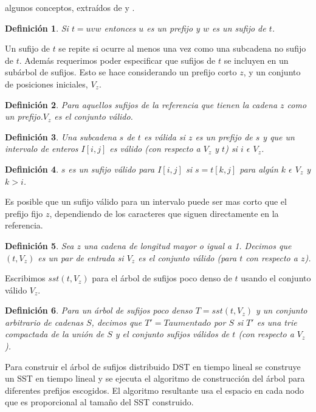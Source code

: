 \documentclass[12pt,a4paper]{article}
\newtheorem{mydef}{Definición}
\begin{document}
algunos conceptos, extraídos de \cite{Clifford2005} y \cite{Ghoting2010}. 
\begin{mydef}
  Si $t=uvw$ entonces $u$ es un \textit{prefijo} y $w$ es un \textit{sufijo}
de $t$.
\end{mydef}
Un sufijo de $t$ se repite si ocurre al menos una vez como una subcadena no sufijo de $t$.
Además requerimos poder especificar que sufijos de $t$ se incluyen en un subárbol de sufijos. Esto
se hace considerando un prefijo corto $z$, y un conjunto de posiciones iniciales, $V_{z}$.
\begin{mydef}
  Para aquellos sufijos de la referencia que tienen la cadena $z$ como un prefijo.$V_{z}$ es el conjunto válido.
\end{mydef}
\begin{mydef}
Una subcadena $s$ de $t$ es válida si $z$ es un prefijo de $s$ y que un intervalo de enteros $I[i,j]$ es
\textit{válido} (con respecto a $V_{z}$ y $t$) si $i$ $\epsilon$ $V_{z}$.
\end{mydef}
\begin{mydef}
  $s$ es un \textit{sufijo válido} para $I[i,j]$ si $s=t[k,j]$ para algún $k$ $\epsilon$ $V_{z}$ y $k>i$. 
\end{mydef}
Es posible que un sufijo válido para un intervalo puede ser mas corto que el prefijo fijo $z$, dependiendo de 
los caracteres que siguen directamente en la referencia.\\
\begin{mydef}
  Sea $z$ una cadena de longitud mayor o igual a 1. Decimos que $(t,V_{z})$ es un \textit{par de entrada} si $V_{z}$ es
el conjunto válido (para $t$ con respecto a $z$).
\end{mydef}
Escribimos $sst(t,V_{z})$ para el árbol de sufijos poco denso de $t$ usando el conjunto válido $V_{z}$. 
\begin{mydef}
  Para un árbol de sufijos poco denso $T=sst(t,V_{z})$ y un conjunto arbitrario de cadenas $S$, decimos que
  $T'=T aumentado$ por $S$ si $T'$ es una trie compactada de la unión de $S$ y el conjunto sufijos válidos de
  $t$ (con respecto a $V_{z}$).
\end{mydef}
Para construir el árbol de sufijos distribuido DST en tiempo lineal se construye un SST en tiempo lineal
y se ejecuta el algoritmo de construcción del árbol para diferentes prefijos escogidos. El algoritmo
resultante usa el espacio en cada nodo que es proporcional al tamaño del SST construido.
\end{document}
